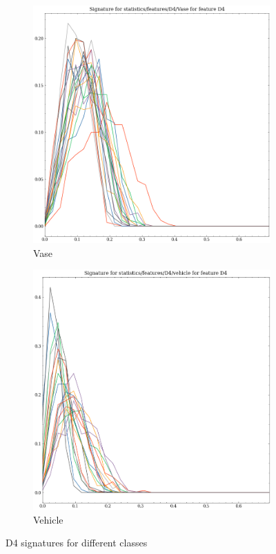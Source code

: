\begin{figure}
    \begin{subfigure}[b]{0.23\textwidth}
        \includegraphics[width=\textwidth]{assets/feature_extraction/D4/Vase.png}
        \caption{Vase}
    \end{subfigure}
    \hfill
    \begin{subfigure}[b]{0.23\textwidth}
        \includegraphics[width=\textwidth]{assets/feature_extraction/D4/vehicle.png}
        \caption{Vehicle}
    \end{subfigure}
    \hfill
    
    \caption{D4 signatures for different classes}
    \label{fig:D4-signatures-2}
\end{figure}

